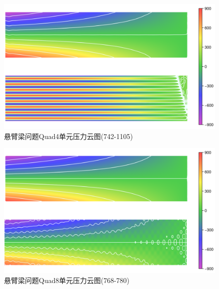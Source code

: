 \begin{figure}[H]
\begin{subcaptiongroup}
    \label{cantilever_32_L2_p}
    \end{subcaptiongroup}
\caption{}
\label{ch_4:fig:cantilever_l2}
\end{figure}

\begin{figure}[!h]
    \centering 
        \includegraphics[scale=0.5]{figures/ch_4/cantilever_mix_quad_16.png}
        \caption{悬臂梁问题Quad4单元压力云图(742-1105)}\label{ch_4:fig:cantilever_mix*16}
\end{figure}

\begin{figure}[!h]
    \centering 
        \includegraphics[scale=0.5]{figures/ch_4/cantilever_mix_quad_8.png}
        \caption{悬臂梁问题Quad8单元压力云图(768-780)}\label{ch_4:fig:cantilever_mix_8}
\end{figure}


